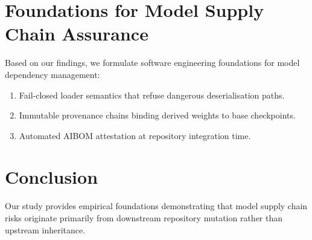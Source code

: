 \documentclass[sigconf,review,anonymous]{acmart}
\begin{document}
\section{Foundations for Model Supply Chain Assurance}
Based on our findings, we formulate software engineering foundations for model dependency management:
\begin{enumerate}
    \item Fail-closed loader semantics that refuse dangerous deserialisation paths.
    \item Immutable provenance chains binding derived weights to base checkpoints.
    \item Automated AIBOM attestation at repository integration time.
\end{enumerate}

\section{Conclusion}
Our study provides empirical foundations demonstrating that model supply chain risks originate primarily from downstream repository mutation rather than upstream inheritance.



\end{document}
